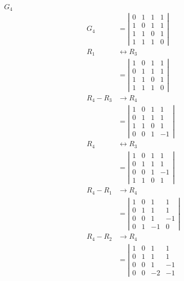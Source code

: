 \documentclass[main.tex]{subfiles}
\begin{document}
\begin{enumerate}
    $G_{4}$
    $$
    \begin{aligned}
    G_{4}&=\left|\begin{array}{llll}
    0 & 1 & 1 & 1 \\
    1 & 0 & 1 & 1 \\
    1 & 1 & 0 & 1 \\
    1 & 1 & 1 & 0
    \end{array}\right|\\
    R_1 &\leftrightarrow R_3\\
    &=\left|\begin{array}{llll}
    1 & 0 & 1 & 1 \\
    0 & 1 & 1 & 1 \\
    1 & 1 & 0 & 1 \\
    1 & 1 & 1 & 0
    \end{array}\right|\\
    R_4 - R_3 &\rightarrow R_4\\
    &=\left|\begin{array}{cccc}
    1 & 0 & 1 & 1 \\
    0 & 1 & 1 & 1 \\
    1 & 1 & 0 & 1 \\
    0 & 0 & 1 & -1
    \end{array}\right|\\
    R_4 &\leftrightarrow R_3\\
    &=\left|\begin{array}{cccc}
    1 & 0 & 1 & 1 \\
    0 & 1 & 1 & 1 \\
    0 & 0 & 1 & -1 \\
    1 & 1 & 0 & 1
    \end{array}\right|\\
    R_4 - R_1 &\rightarrow R_4\\
    &=\left|\begin{array}{cccc}
    1 & 0 & 1 & 1 \\
    0 & 1 & 1 & 1 \\
    0 & 0 & 1 & -1 \\
    0 & 1 & -1 & 0
    \end{array}\right|\\
    R_4 - R_2 &\rightarrow R_4\\
    &=\left|\begin{array}{cccc}
    1 & 0 & 1 & 1 \\
    0 & 1 & 1 & 1 \\
    0 & 0 & 1 & -1 \\
    0 & 0 & -2 & -1

\end{array}
\end{aligned}$$
\end{enumerate}
\end{document}
